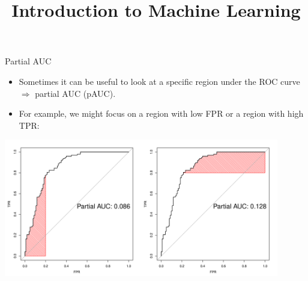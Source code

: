 \documentclass[11pt,compress,t,notes=noshow, xcolor=table]{beamer}
\title{Introduction to Machine Learning}
\institute{\href{https://compstat-lmu.github.io/lecture_i2ml/}{compstat-lmu.github.io/lecture\_i2ml}}
\date{}
\newenvironment{knitrout}{}{} %
\begin{document}








\begin{vbframe}{Partial AUC}

\begin{itemize}
  \item Sometimes it can be useful to look at a specific region under the ROC 
  curve $\Rightarrow$ partial AUC (pAUC).
  \item For example, we might focus on a region with low FPR or a region with 
  high TPR:
\end{itemize}

\begin{knitrout}\scriptsize
{}\color{fgcolor}
{\centering \includegraphics[width=0.9\textwidth]{figure/eval_mclass_roc_sp_13} }
\end{knitrout}

\end{vbframe}

\end{document}
